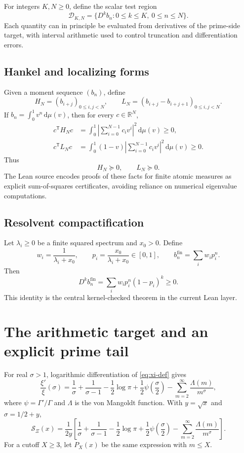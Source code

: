 \documentclass[11pt]{article}
\theoremstyle{definition}
\newcommand{\R}{\mathbb R}
\newcommand{\XiR}{\mathcal S_{\Xi}}
\newcommand{\dd}{\,\mathrm d}
\begin{document}
For integers $K,N\ge0$, define the scalar test region
\[
 \mathcal D_{K,N}=\{D^kb_n:0\le k\le K,\ 0\le n\le N\}.
\]
Each quantity can in principle be evaluated from derivatives of the prime-side target, with
interval arithmetic used to control truncation and differentiation errors.

\subsection{Hankel and localizing forms}

Given a moment sequence $(b_n)$, define
\[
 H_N=(b_{i+j})_{0\le i,j<N},
 \qquad
 L_N=(b_{i+j}-b_{i+j+1})_{0\le i,j<N}.
\]
If $b_n=\int_0^1v^n\dd\mu(v)$, then for every $c\in\R^N$,
\begin{align*}
 c^\mathsf{T}H_Nc
 &=\int_0^1\left|\sum_{i=0}^{N-1}c_iv^i\right|^2\dd\mu(v)\ge0,\\
 c^\mathsf{T}L_Nc
 &=\int_0^1(1-v)\left|\sum_{i=0}^{N-1}c_iv^i\right|^2\dd\mu(v)\ge0.
\end{align*}
Thus
\[
 H_N\succeq0,\qquad L_N\succeq0.
\]
The Lean source encodes proofs of these facts for finite atomic measures as explicit sum-of-squares
certificates, avoiding reliance on numerical eigenvalue computations.

\subsection{Resolvent compactification}

Let $\lambda_i\ge0$ be a finite squared spectrum and $x_0>0$. Define
\[
 w_i=\frac{1}{\lambda_i+x_0},
 \qquad
 p_i=\frac{x_0}{\lambda_i+x_0}\in[0,1],
 \qquad
 b_n^{\mathrm{fin}}=\sum_iw_ip_i^n.
\]
Then
\begin{equation}\label{eq:finite-difference-identity}
 D^kb_n^{\mathrm{fin}}
 =\sum_iw_ip_i^n(1-p_i)^k\ge0.
\end{equation}
This identity is the central kernel-checked theorem in the current Lean layer.

\section{The arithmetic target and an explicit prime tail}

For real $\sigma>1$, logarithmic differentiation of \eqref{eq:xi-def} gives
\begin{equation}\label{eq:xi-log-derivative}
 \frac{\xi'}{\xi}(\sigma)
 =\frac1\sigma+\frac1{\sigma-1}-\frac12\log\pi
 +\frac12\psi\left(\frac\sigma2\right)
 -\sum_{m=2}^{\infty}\frac{\Lambda(m)}{m^\sigma},
\end{equation}
where $\psi=\Gamma'/\Gamma$ and $\Lambda$ is the von Mangoldt function. With
$y=\sqrt{x}$ and $\sigma=1/2+y$,
\begin{equation}\label{eq:prime-target}
 \XiR(x)=\frac{1}{2y}\left[
 \frac1\sigma+\frac1{\sigma-1}-\frac12\log\pi
 +\frac12\psi\left(\frac\sigma2\right)
 -\sum_{m=2}^{\infty}\frac{\Lambda(m)}{m^\sigma}
 \right].
\end{equation}
For a cutoff $X\ge3$, let $P_X(x)$ be the same expression with $m\le X$.
\end{document}
